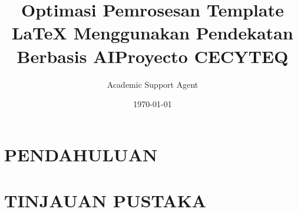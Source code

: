 \documentclass{article}
\title{Optimasi Pemrosesan Template LaTeX Menggunakan Pendekatan Berbasis AI}
\author{Academic Support Agent}
\date{\today}
\begin{document}
\maketitle

\begin{abstract}

\end{abstract}

\chapter{PENDAHULUAN}


\chapter{TINJAUAN PUSTAKA}



\title{Proyecto CECYTEQ}
\usepackage{wrapfig}
\usepackage[spanish]{babel} %
\usepackage[utf8]{inputenc} %
\usepackage{amsmath} %
\usepackage{amssymb} %
\usepackage{graphicx} %
\usepackage{color} %
\usepackage{subfigure} %
\usepackage{float} %
\usepackage{capt-of} %
\usepackage{sidecap} %
\usepackage{caption} %
\usepackage{commath} %
\usepackage{cancel} %
 
\usepackage{anysize} 					%
\marginsize{3cm}{3cm}{2cm}{2cm} %

\usepackage{appendix}
\renewcommand{\appendixname}{Apéndices}
\renewcommand{\appendixtocname}{Apéndices}
\renewcommand{\appendixpagename}{Apéndices} 

\usepackage[colorlinks=true,plainpages=true,citecolor=blue,linkcolor=black]{hyperref}
\end{document}
